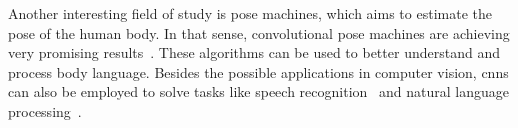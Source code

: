 Another interesting field of study is pose machines, which aims to estimate the pose of the human body. In that sense, convolutional pose machines are achieving very promising results~\cite{DBLP:journals/corr/WeiRKS16}. These algorithms can be used to better understand and process body language. Besides the possible applications in computer vision, \glspl{cnn} can also be employed to solve tasks like speech recognition~\cite{conf/icassp/Abdel-HamidMJP12} and natural language processing~\cite{DBLP:journals/corr/LopezK17}.